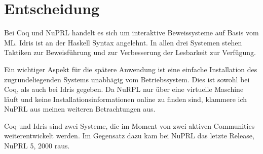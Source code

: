 \section{Entscheidung}
Bei Coq und NuPRL handelt es sich um interaktive Beweissysteme auf Basis vom ML. Idris ist an der Haskell Syntax angelehnt. In allen drei Systemen stehen Taktiken zur Beweisf\"uhrung und zur Verbesserung der Lesbarkeit zur Verf\"ugung.

Ein wichtiger Aspekt f\"ur die sp\"atere Anwendung ist eine einfache Installation des zugrundeliegenden Systems unabh\"agig vom Betriebssystem. Dies ist sowohl bei Coq, als auch bei Idris gegeben. Da NuRPL nur \"uber eine virtuelle Maschine l\"auft und keine Installationsinformationen online zu finden sind, klammere ich NuPRL aus meinen weiteren Betrachtungen aus.

Coq und Idris sind zwei Systeme, die im Moment von zwei aktiven Communities weiterentwickelt werden. Im Gegensatz dazu kam bei NuPRL das letzte Release, NuPRL 5, 2000 raus. 

